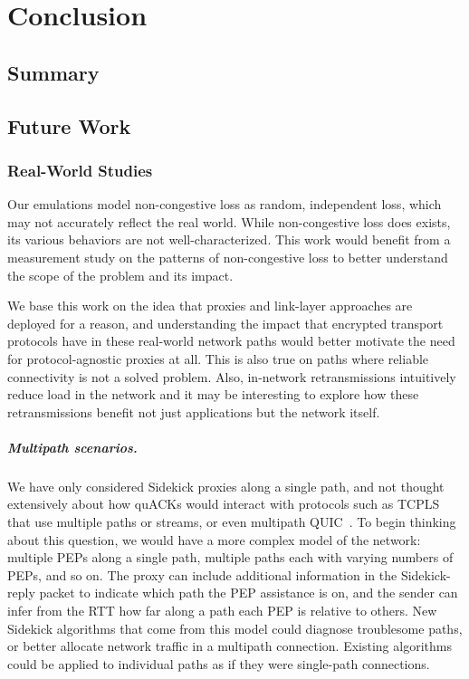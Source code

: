 \chapter{Conclusion}
\section{Summary}
\section{Future Work}

\subsection{Real-World Studies}

Our emulations model non-congestive loss as random, independent loss,
which may not accurately reflect the real world. While non-congestive loss
does exists, its various behaviors are not well-characterized. This work
would benefit from a measurement study on the patterns of non-congestive loss
to better understand the scope of the problem and its impact.

We base this work on the idea that proxies and link-layer approaches are
deployed for a reason, and understanding the impact that encrypted transport
protocols have in these real-world network paths would better motivate the need
for protocol-agnostic proxies at all. This is also true on paths where
reliable connectivity is not a solved problem. Also,
in-network retransmissions intuitively reduce load in the network and it may be
interesting to explore how these retransmissions benefit not just
applications but the network itself.

\paragraph{Multipath scenarios.}
We have only considered Sidekick proxies along a single path, and not thought
extensively about how quACKs would interact with protocols such as
\mbox{TCPLS}~\cite{rochet2020tcpls} that use multiple paths or streams,
or even multipath QUIC~\cite{de2017multipath}.
To begin thinking about this question, we would have a more complex model of
the network: multiple PEPs along a single path, multiple paths each with varying
numbers of PEPs, and so on. The proxy can include
additional information in the Sidekick-reply packet to indicate which path the
PEP assistance is on, and the sender can infer from the RTT how far along a path each PEP
is relative to others. New Sidekick algorithms that come from this model could
diagnose troublesome paths, or better allocate network traffic in a multipath
connection. Existing algorithms could be applied to individual paths as if they
were single-path connections.


